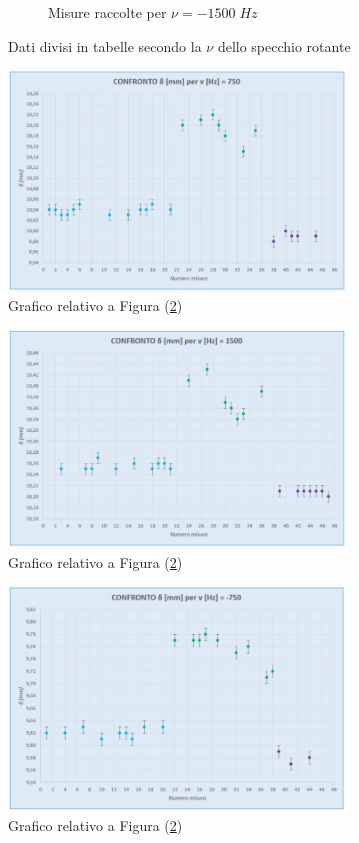 \documentclass{article}
\begin{document}
\begin{figure}[h]
\begin{subfigure}[h]{0.2\linewidth}
        \caption{Misure raccolte per $\nu=-1500 \; Hz$}
        \label{Tab_-1500}
    \end{subfigure}
        \caption{Dati divisi in tabelle secondo la $\nu$ dello specchio rotante}
        \label{Tabs}
\end{figure}

\begin{figure}[h]
    \centering
    \includegraphics[width=0.8\textwidth]{Coerenza_G1.JPG}
    \caption{Grafico relativo a Figura (\ref{Tabs})}
    \label{Graf_750}
\end{figure}

\begin{figure}[h]
    \centering
    \includegraphics[width=0.8\textwidth]{Coerenza_G2.JPG}
    \caption{Grafico relativo a Figura (\ref{Tabs})}
    \label{Graf_1500}
\end{figure}

\begin{figure}[h]
    \centering
    \includegraphics[width=0.8\textwidth]{Coerenza_G3.JPG}
    \caption{Grafico relativo a Figura (\ref{Tabs})}
    \label{Graf_-750}
\end{figure}
\end{document}
